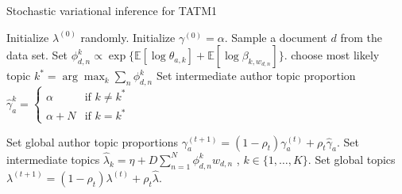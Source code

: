 \begin{algorithm}[tb]
\caption{Stochastic variational inference for TATM1}
\label{alg:stoch_tatm1}
\begin{algorithmic}[1]
	\STATE Initialize $\lambda^{(0)}$ randomly.
	\STATE Initialize $\gamma^{(0)} = \alpha$.
	\REPEAT
		\STATE Sample a document $d$ from the data set.
			\STATE Set $\phi^k_{d,n} \propto \exp \{ \mathbb{E}[\log \theta_{a,k}] + \mathbb{E}[\log \beta_{k,w_{d,n}}] \}$.
		\ENDFOR
		\STATE choose most likely topic $k^*=\arg\max_k \sum_n \phi^k_{d,n}$
		\STATE Set intermediate author topic proportion $\hat{\gamma}^k_a = 
			\left\lbrace \begin{array}{ll}
			\alpha & \textrm{if }k\neq k^* \\
			\alpha + N & \textrm{if }k=k^*
			\end{array}   \right. $
		
		\STATE Set global author topic proportions $\gamma_a^{(t+1)} = (1 - \rho_t) \gamma_a^{(t)} + \rho_t \hat{\gamma}_a$.
		\STATE Set intermediate topics $\hat{\lambda}_k = \eta +D  \sum_{n=1}^{N}{\phi_{d,n}^k w_{d,n}}$ , $k\in\{1,\dots,K\}$.
		\STATE Set global topics $\lambda^{(t+1)} = (1 - \rho_t) \lambda^{(t)} + \rho_t \hat{\lambda}$.
\end{algorithmic}
\end{algorithm}